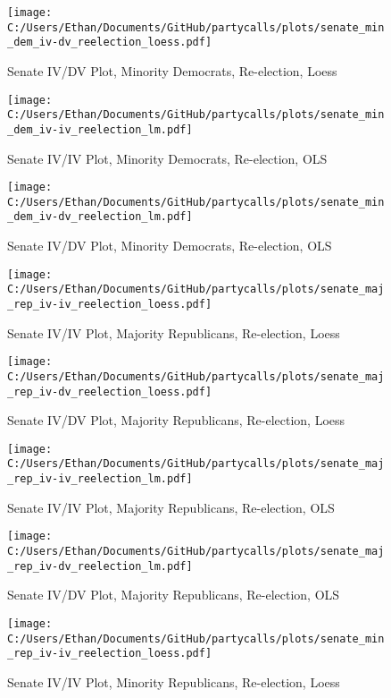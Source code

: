\documentclass[12pt]{article}
\begin{document}
\begin{figure}[H]
	\centering
	\caption{Senate IV/DV Plot, Minority Democrats, Re-election, Loess}
	\texttt{[image: C:/Users/Ethan/Documents/GitHub/partycalls/plots/senate\_min\_dem\_iv-dv\_reelection\_loess.pdf]}
\end{figure}

\begin{figure}[H]
	\centering
	\caption{Senate IV/IV Plot, Minority Democrats, Re-election, OLS}
	\texttt{[image: C:/Users/Ethan/Documents/GitHub/partycalls/plots/senate\_min\_dem\_iv-iv\_reelection\_lm.pdf]}
\end{figure}

\begin{figure}[H]
	\centering
	\caption{Senate IV/DV Plot, Minority Democrats, Re-election, OLS}
	\texttt{[image: C:/Users/Ethan/Documents/GitHub/partycalls/plots/senate\_min\_dem\_iv-dv\_reelection\_lm.pdf]}
\end{figure}

\begin{figure}[H]
	\centering
	\caption{Senate IV/IV Plot, Majority Republicans, Re-election, Loess}
	\texttt{[image: C:/Users/Ethan/Documents/GitHub/partycalls/plots/senate\_maj\_rep\_iv-iv\_reelection\_loess.pdf]}
\end{figure}

\begin{figure}[H]
	\centering
	\caption{Senate IV/DV Plot, Majority Republicans, Re-election, Loess}
	\texttt{[image: C:/Users/Ethan/Documents/GitHub/partycalls/plots/senate\_maj\_rep\_iv-dv\_reelection\_loess.pdf]}
\end{figure}

\begin{figure}[H]
	\centering
	\caption{Senate IV/IV Plot, Majority Republicans, Re-election, OLS}
	\texttt{[image: C:/Users/Ethan/Documents/GitHub/partycalls/plots/senate\_maj\_rep\_iv-iv\_reelection\_lm.pdf]}
\end{figure}

\begin{figure}[H]
	\centering
	\caption{Senate IV/DV Plot, Majority Republicans, Re-election, OLS}
	\texttt{[image: C:/Users/Ethan/Documents/GitHub/partycalls/plots/senate\_maj\_rep\_iv-dv\_reelection\_lm.pdf]}
\end{figure}

\begin{figure}[H]
	\centering
	\caption{Senate IV/IV Plot, Minority Republicans, Re-election, Loess}
	\texttt{[image: C:/Users/Ethan/Documents/GitHub/partycalls/plots/senate\_min\_rep\_iv-iv\_reelection\_loess.pdf]}
\end{figure}
\end{document}
